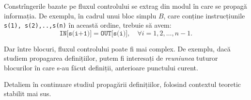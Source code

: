 Constrîngerile bazate pe fluxul controlului se extrag din modul
în care se propagă informația. De exemplu, în cadrul unui bloc simplu $ B $,
care conține instrucțiunile \texttt{s(1), s(2),..,s(n)} în această ordine,
trebuie să avem:
\[
  \texttt{IN[s(i+1)]} = \texttt{OUT[s(i)]}, \quad \forall i = 1, 2, \dots, n-1.
\]

Dar între blocuri, fluxul controlului poate fi mai complex. De exemplu,
dacă studiem propagarea definițiilor, putem fi interesați de \emph{reuniunea}
tuturor blocurilor în care s-au făcut definiții, anterioare punctului curent.

\vspace{0.5cm}

Detaliem în continuare studiul propagării definițiilor, folosind contextul
teoretic stabilit mai sus.

